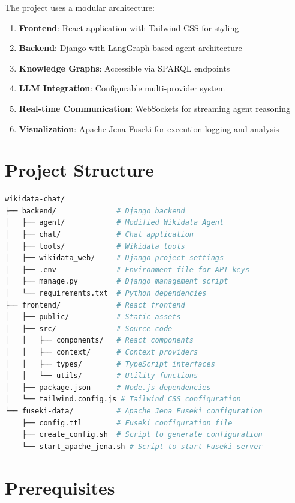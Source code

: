 The project uses a modular architecture:

\begin{enumerate}
    \item \textbf{Frontend}: React application with Tailwind CSS for styling
    \item \textbf{Backend}: Django with LangGraph-based agent architecture
    \item \textbf{Knowledge Graphs}: Accessible via SPARQL endpoints
    \item \textbf{LLM Integration}: Configurable multi-provider system
    \item \textbf{Real-time Communication}: WebSockets for streaming agent reasoning
    \item \textbf{Visualization}: Apache Jena Fuseki for execution logging and analysis
\end{enumerate}

\section*{Project Structure}

\begin{lstlisting}[language=bash]
wikidata-chat/
├── backend/              # Django backend
│   ├── agent/            # Modified Wikidata Agent
│   ├── chat/             # Chat application
│   ├── tools/            # Wikidata tools
│   ├── wikidata_web/     # Django project settings
│   ├── .env              # Environment file for API keys
│   ├── manage.py         # Django management script
│   └── requirements.txt  # Python dependencies
├── frontend/             # React frontend
│   ├── public/           # Static assets
│   ├── src/              # Source code
│   │   ├── components/   # React components
│   │   ├── context/      # Context providers
│   │   ├── types/        # TypeScript interfaces
│   │   └── utils/        # Utility functions
│   ├── package.json      # Node.js dependencies
│   └── tailwind.config.js # Tailwind CSS configuration
└── fuseki-data/          # Apache Jena Fuseki configuration
    ├── config.ttl        # Fuseki configuration file
    ├── create_config.sh  # Script to generate configuration
    └── start_apache_jena.sh # Script to start Fuseki server
\end{lstlisting}

\section*{Prerequisites}

